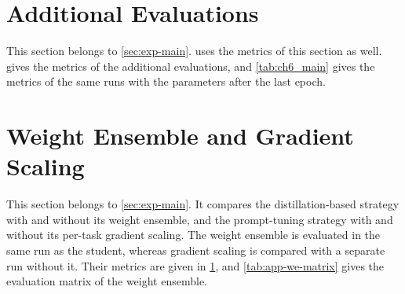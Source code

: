 \FloatBarrier
\section{Additional Evaluations}
\label{sec:app-additional}

This section belongs to \cref{sec:exp-main}.
 uses the metrics of this section as well.
 gives the metrics of the additional evaluations, and \cref{tab:ch6_main} gives the metrics of the same runs with the parameters after the last epoch.

\begin{table}[!tb]
\centering
\caption[Additional evaluations]{Additional evaluations (full training split, original task order, one run each). Best validation: checkpoint with the lowest validation loss (\cref{sec:method-adaptation}). Weight ensemble: the weight ensemble of the distillation-based strategy (\cref{subsec:method-distillation}). No scaling: without the per-task gradient scaling (\cref{subsec:method-prompt}). Mean \gls{dsc}; $\uparrow$/$\downarrow$: higher/lower is better.}
\label{tab:ch6_components}

\end{table}

\FloatBarrier
\section{Weight Ensemble and Gradient Scaling}
\label{sec:exp-components}
This section belongs to \cref{sec:exp-main}.
It compares the distillation-based strategy with and without its weight ensemble, and the prompt-tuning strategy with and without its per-task gradient scaling.
The weight ensemble is evaluated in the same run as the student, whereas gradient scaling is compared with a separate run without it.
Their metrics are given in \cref{sec:app-additional}, and \cref{tab:app-we-matrix} gives the evaluation matrix of the weight ensemble.

